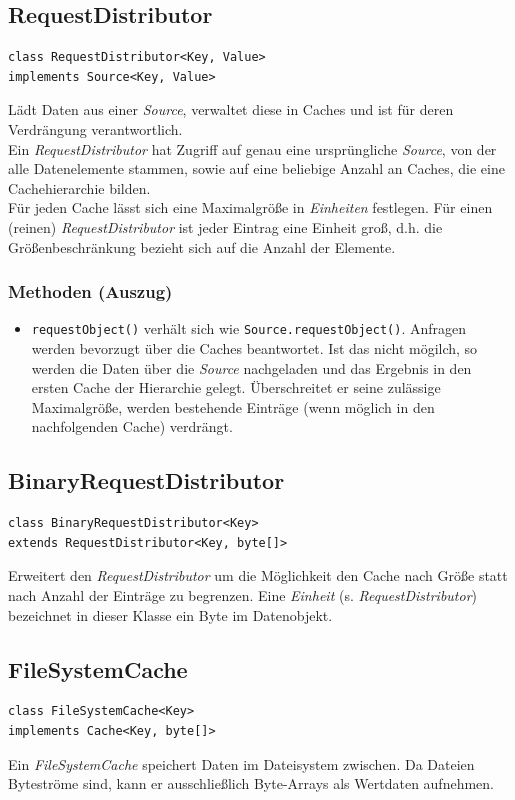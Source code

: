 \documentclass[10pt]{scrreprt}
\begin{document}
\subsection*{RequestDistributor}
\begin{lstlisting}
class RequestDistributor<Key, Value>
implements Source<Key, Value>
\end{lstlisting}
Lädt Daten aus einer \textit{Source}, verwaltet diese in Caches und ist für deren Verdrängung verantwortlich.\\
Ein \textit{RequestDistributor} hat Zugriff auf genau eine ursprüngliche \textit{Source}, von der alle Datenelemente stammen, sowie auf eine beliebige Anzahl an Caches, die eine Cachehierarchie bilden.\\
Für jeden Cache lässt sich eine Maximalgröße in \textit{Einheiten} festlegen. Für einen (reinen) \textit{RequestDistributor} ist jeder Eintrag eine Einheit groß, d.h. die Größenbeschränkung bezieht sich auf die Anzahl der Elemente.\\
\subsubsection*{Methoden (Auszug)}
\begin{itemize}
\item \texttt{requestObject()} verhält sich wie \texttt{Source.requestObject()}. Anfragen werden bevorzugt über die Caches beantwortet. Ist das nicht mögilch, so werden die Daten über die \textit{Source} nachgeladen und das Ergebnis in den ersten Cache der Hierarchie gelegt. Überschreitet er seine zulässige Maximalgröße, werden bestehende Einträge (wenn möglich in den nachfolgenden Cache) verdrängt. 
\end{itemize}
\vspace{5mm}
\subsection*{BinaryRequestDistributor}
\begin{lstlisting}
class BinaryRequestDistributor<Key>
extends RequestDistributor<Key, byte[]>
\end{lstlisting}
Erweitert den \textit{RequestDistributor} um die Möglichkeit den Cache nach Größe statt nach Anzahl der Einträge zu begrenzen. Eine \textit{Einheit} (s. \textit{RequestDistributor}) bezeichnet in dieser Klasse ein Byte im Datenobjekt.
\pagebreak
\subsection*{FileSystemCache}
\begin{lstlisting}
class FileSystemCache<Key>
implements Cache<Key, byte[]>
\end{lstlisting}
Ein \textit{FileSystemCache} speichert Daten im Dateisystem zwischen. Da Dateien Byteströme sind, kann er ausschließlich Byte-Arrays als Wertdaten aufnehmen.\\
\end{document}
